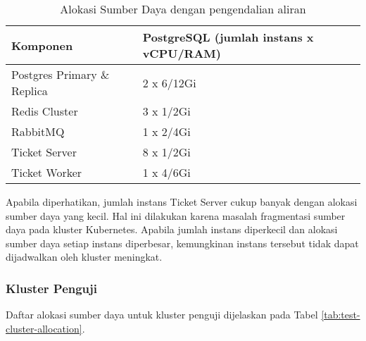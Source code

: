\pagebreak

\begin{table}[H]
    \centering
    \caption{Alokasi Sumber Daya dengan pengendalian aliran}
    \label{tab:service_comparison_fc}
    \begin{tabular}{|l|l|}
        \hline
        \textbf{Komponen}           & \textbf{PostgreSQL (jumlah instans x vCPU/RAM)} \\ \hline
        Postgres Primary \& Replica & 2 x 6/12Gi                                      \\ \hline
        Redis Cluster               & 3 x 1/2Gi                                       \\ \hline
        RabbitMQ                    & 1 x 2/4Gi                                       \\ \hline
        Ticket Server               & 8 x 1/2Gi                                       \\ \hline
        Ticket Worker               & 1 x 4/6Gi                                       \\ \hline
    \end{tabular}
\end{table}

Apabila diperhatikan, jumlah instans Ticket Server cukup banyak dengan alokasi sumber daya yang kecil. Hal ini dilakukan karena masalah fragmentasi sumber daya pada kluster Kubernetes. Apabila jumlah instans diperkecil dan alokasi sumber daya setiap instans diperbesar, kemungkinan instans tersebut tidak dapat dijadwalkan oleh kluster meningkat.

\subsubsection{Kluster Penguji}

Daftar alokasi sumber daya untuk kluster penguji dijelaskan pada Tabel \ref{tab:test-cluster-allocation}.

